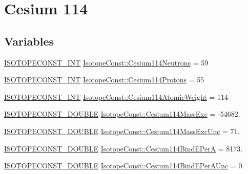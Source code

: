 \hypertarget{group___isotope_const-_cesium-_cs114}{}\section{Cesium 114}
\label{group___isotope_const-_cesium-_cs114}
\subsection*{Variables}
\begin{DoxyCompactItemize}
\item 
\mbox{\hyperlink{group___isotope_const-_macros_ga5f18360b3e99483a35c32d789e62621c}{I\+S\+O\+T\+O\+P\+E\+C\+O\+N\+S\+T\+\_\+\+I\+NT}} \mbox{\hyperlink{group___isotope_const-_cesium-_cs114_ga7e958a21c075dda6fd6895e7640febe2}{Isotope\+Const\+::\+Cesium114\+Neutrons}} = 59
\item 
\mbox{\hyperlink{group___isotope_const-_macros_ga5f18360b3e99483a35c32d789e62621c}{I\+S\+O\+T\+O\+P\+E\+C\+O\+N\+S\+T\+\_\+\+I\+NT}} \mbox{\hyperlink{group___isotope_const-_cesium-_cs114_gaafc6fd8a049e046ecdd1438aa9439577}{Isotope\+Const\+::\+Cesium114\+Protons}} = 55
\item 
\mbox{\hyperlink{group___isotope_const-_macros_ga5f18360b3e99483a35c32d789e62621c}{I\+S\+O\+T\+O\+P\+E\+C\+O\+N\+S\+T\+\_\+\+I\+NT}} \mbox{\hyperlink{group___isotope_const-_cesium-_cs114_ga39d7d14276bcf2695d91410c2c82afdc}{Isotope\+Const\+::\+Cesium114\+Atomic\+Weight}} = 114
\item 
\mbox{\hyperlink{group___isotope_const-_macros_ga8f45a7272ce02c0b4c65c44636ed719a}{I\+S\+O\+T\+O\+P\+E\+C\+O\+N\+S\+T\+\_\+\+D\+O\+U\+B\+LE}} \mbox{\hyperlink{group___isotope_const-_cesium-_cs114_ga08d7cccc5cfcb90571dc0f069b690017}{Isotope\+Const\+::\+Cesium114\+Mass\+Exc}} = -\/54682.
\item 
\mbox{\hyperlink{group___isotope_const-_macros_ga8f45a7272ce02c0b4c65c44636ed719a}{I\+S\+O\+T\+O\+P\+E\+C\+O\+N\+S\+T\+\_\+\+D\+O\+U\+B\+LE}} \mbox{\hyperlink{group___isotope_const-_cesium-_cs114_ga8fac3c11271498bcf164992ea00f1208}{Isotope\+Const\+::\+Cesium114\+Mass\+Exc\+Unc}} = 71.
\item 
\mbox{\hyperlink{group___isotope_const-_macros_ga8f45a7272ce02c0b4c65c44636ed719a}{I\+S\+O\+T\+O\+P\+E\+C\+O\+N\+S\+T\+\_\+\+D\+O\+U\+B\+LE}} \mbox{\hyperlink{group___isotope_const-_cesium-_cs114_gab79a9a5edcfccc468d65b946ac7f1632}{Isotope\+Const\+::\+Cesium114\+Bind\+E\+PerA}} = 8173.
\item 
\mbox{\hyperlink{group___isotope_const-_macros_ga8f45a7272ce02c0b4c65c44636ed719a}{I\+S\+O\+T\+O\+P\+E\+C\+O\+N\+S\+T\+\_\+\+D\+O\+U\+B\+LE}} \mbox{\hyperlink{group___isotope_const-_cesium-_cs114_gaf713e7b6eeee08e4d337c88267969864}{Isotope\+Const\+::\+Cesium114\+Bind\+E\+Per\+A\+Unc}} = 0.

\end{DoxyCompactItemize}
